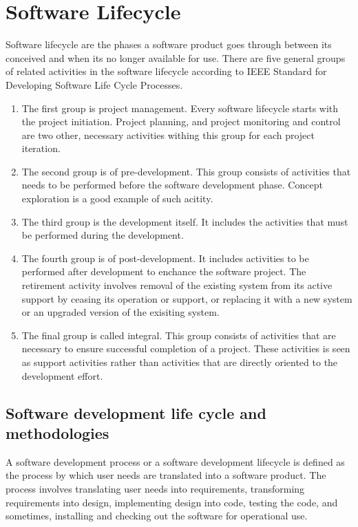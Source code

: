 
\section{Software Lifecycle}
Software lifecycle are the phases a software product goes through between its conceived and when its no longer available for use. There are five general groups of related activities in the software lifecycle according to IEEE Standard for Developing Software Life Cycle Processes\cite{159431}. 

\begin{enumerate}
	\item The first group is project management. Every software lifecycle starts with the project initiation. Project planning, and project monitoring and control are two other, necessary activities withing this group for each project iteration. 
	\item The second group is of pre-development. This group consists of activities that needs to be performed before the software development phase. Concept exploration is a good example of such acitity. 
	\item The third group is the development itself. It includes the activities that must be performed during the development.
	\item The fourth group is of post-development. It includes activities to be performed after development to enchance the software project. The retirement activity involves removal of the existing system from its active support by ceasing its operation or support, or replacing it with a new system or an upgraded version of the exisiting system. 
	\item The final group is called integral. This group consists of activities that are necessary to ensure successful completion of a project. These activities is seen as support activities rather than activities that are directly oriented to the development effort.
\end{enumerate}

\subsection{Software development life cycle and methodologies} %
A software development process or a software development lifecycle is defined as the process by which user needs are translated into a software product\cite{radatz1990ieee}. The process involves translating user needs into requirements, transforming requirements into design, implementing design into code, testing the code, and sometimes, installing and checking out the software for operational use.

